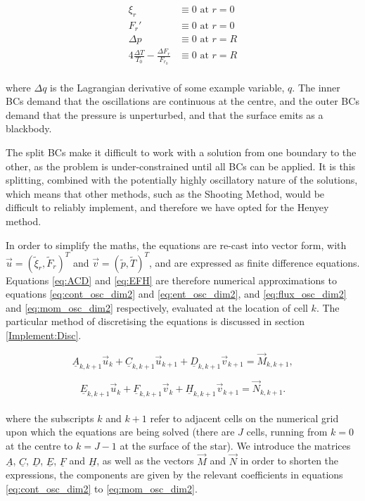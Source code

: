 \documentclass[11pt]{amsart}
\begin{document}
\begin{align}
\xi_{r} &\equiv 0 \text{ at } r = 0 \\
F_{r}' &\equiv 0 \text{ at } r = 0 \\
\Delta p &\equiv  0 \text{ at } r = R \\
4 \frac{\Delta T}{T_{0}} - \frac{\Delta F_{r}}{F_{r_{0}}} &\equiv  0 \text{ at } r = R
\end{align}
\\

where $\Delta q$ is the Lagrangian derivative of some example variable, $q$.  The inner BCs demand that the oscillations are continuous at the centre, and the outer BCs demand that the pressure is unperturbed, and that the surface emits as a blackbody.

The split BCs make it difficult to work with a solution from one boundary to the other, as the problem is under-constrained until all BCs can be applied.  It is this splitting, combined with the potentially highly oscillatory nature of the solutions, which means that other methods, such as the Shooting Method, would be difficult to reliably implement, and therefore we have opted for the Henyey method.

In order to simplify the maths, the equations are re-cast into vector form, with $\vec{u} = \left( \tilde{\xi}_{r}, \tilde{F}_{r} \right)^{T}$ and $\vec{v} = \left( \tilde{p}, \tilde{T} \right)^{T}$, and are expressed as finite difference equations.  Equations \ref{eq:ACD} and \ref{eq:EFH} are therefore numerical approximations to equations \ref{eq:cont_osc_dim2} and \ref{eq:ent_osc_dim2}, and \ref{eq:flux_osc_dim2} and \ref{eq:mom_osc_dim2} respectively, evaluated at the location of cell $k$.  The particular method of discretising the equations is discussed in section \ref{Implement:Disc}.  


\begin{equation} \label{eq:ACD}
\underline{A}_{k,k+1} \vec{u}_{k} + \underline{C}_{k,k+1} \vec{u}_{k+1} + \underline{D}_{k,k+1} \vec{v}_{k+1} = \vec{M}_{k,k+1},
\end{equation} 

\begin{equation} \label{eq:EFH}
\underline{E}_{k,k+1} \vec{u}_{k} + \underline{F}_{k,k+1} \vec{v}_{k} + \underline{H}_{k,k+1} \vec{v}_{k+1} = \vec{N}_{k,k+1}.
\end{equation} 
\\

where the subscripts $k$ and $k+1$ refer to adjacent cells on the numerical grid upon which the equations are being solved (there are $J$ cells, running from $k = 0$ at the centre to $k = J - 1$ at the surface of the star).  We introduce the matrices $\underline{A}$, $\underline{C}$, $\underline{D}$, $\underline{E}$, $\underline{F}$ and $\underline{H}$, as well as the vectors $\vec{M}$ and $\vec{N}$ in order to shorten the expressions, the components are given by the relevant coefficients in equations \ref{eq:cont_osc_dim2} to \ref{eq:mom_osc_dim2}.
\end{document}
